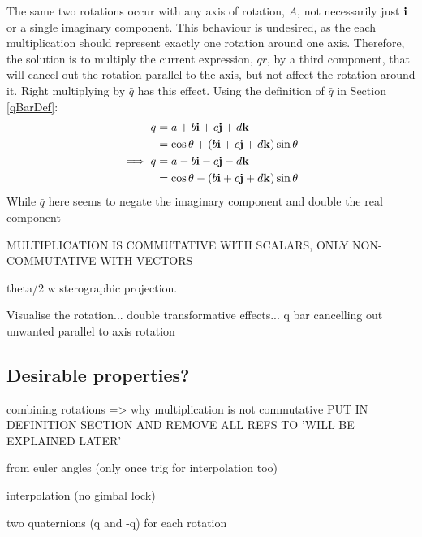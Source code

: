 \documentclass[10pt]{article}
\begin{document}
The same two rotations occur with any axis of rotation, $A$, not necessarily just $\vb{i}$ or a single imaginary component. This behaviour is undesired, as the each multiplication should represent exactly one rotation around one axis. Therefore, the solution is to multiply the current expression, $qr$, by a third component, that will cancel out the rotation parallel to the axis, but not affect the rotation around it. Right multiplying by $\bar{q}$ has this effect. Using the definition of $\bar{q}$ in Section \ref{qBarDef}:
\begin{equation}
    \begin{aligned}
        q &= a + b\vb{i} + c\vb{j} + d\vb{k} \\
          &= \cos\theta + (b\vb{i} + c\vb{j} + d\vb{k})\sin\theta \\
        \implies \bar{q} &= a - b\vb{i} - c\vb{j} - d\vb{k} \\
          &= \cos\theta - (b\vb{i} + c\vb{j} + d\vb{k})\sin\theta
    \end{aligned}
\end{equation}
While $\bar{q}$ here seems to negate the imaginary component and double the real component

MULTIPLICATION IS COMMUTATIVE WITH SCALARS, ONLY NON-COMMUTATIVE WITH VECTORS

theta/2 w sterographic projection.

Visualise the rotation... double transformative effects...
q bar cancelling out unwanted parallel to axis rotation

\subsection{Desirable properties?}

combining rotations => why multiplication is not commutative PUT IN DEFINITION SECTION AND REMOVE ALL REFS TO 'WILL BE EXPLAINED LATER'

from euler angles (only once trig for interpolation too)

interpolation (no gimbal lock)

two quaternions (q and -q) for each rotation

\pagebreak

\printbibliography
\end{document}
